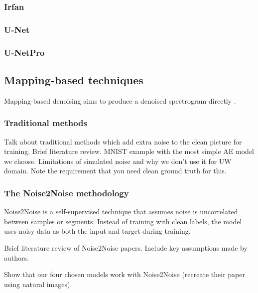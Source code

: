 \subsubsection{Irfan}

\subsubsection{U-Net}

\subsubsection{U-NetPro}

\subsection{Mapping-based techniques}

Mapping-based denoising aims to produce a denoised spectrogram directly \cite{zhou_self-noise_2023}. 

\subsubsection{Traditional methods}

Talk about traditional methods which add extra noise to the clean picture for training. Brief literature review. MNIST example with the most simple AE model we choose. Limitations of simulated noise and why we don't use it for UW domain. Note the requirement that you need clean ground truth for this.


\subsubsection{The Noise2Noise methodology}

Noise2Noise is a self-supervised technique that assumes noise is uncorrelated between samples or segments. Instead of training with clean labels, the model uses noisy data as both the input and target during training. 

Brief literature review of Noise2Noise papers. Include key assumptions made by authors.

Show that our four chosen models work with Noise2Noise (recreate their paper using natural images).

